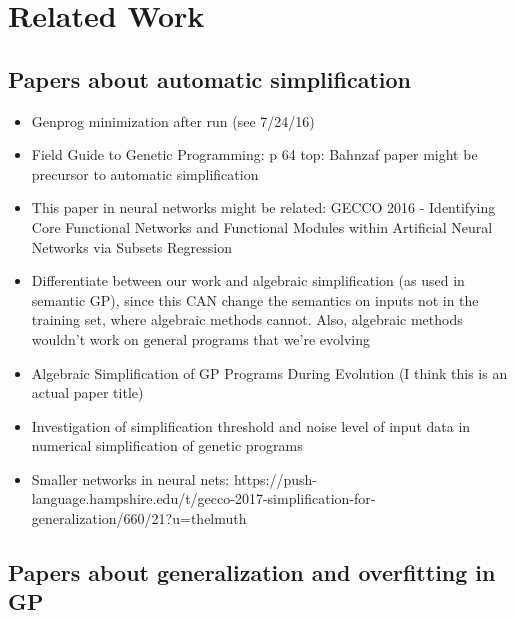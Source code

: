 \section{Related Work}
\label{sec:related}



\subsection{Papers about automatic simplification}

\begin{itemize}

\item
Genprog minimization after run (see 7/24/16)

\item
Field Guide to Genetic Programming: p 64 top: Bahnzaf paper might be precursor to automatic simplification

\item
This paper in neural networks might be related: GECCO 2016 - Identifying Core Functional Networks and Functional Modules within Artificial Neural Networks via Subsets Regression

\item
Differentiate between our work and algebraic simplification (as used in semantic GP), since this CAN change the semantics on inputs not in the training set, where algebraic methods cannot. Also, algebraic methods wouldn't work on general programs that we're evolving

\item
Algebraic Simplification of GP Programs During Evolution (I think this is an actual paper title)

\item
Investigation of simplification threshold and noise level of input data in numerical simplification of genetic programs \cite{Kinzett:2010:cec}

\item
Smaller networks in neural nets: https://push-language.hampshire.edu/t/gecco-2017-simplification-for-generalization/660/21?u=thelmuth

\end{itemize}

\subsection{Papers about generalization and overfitting in GP}

